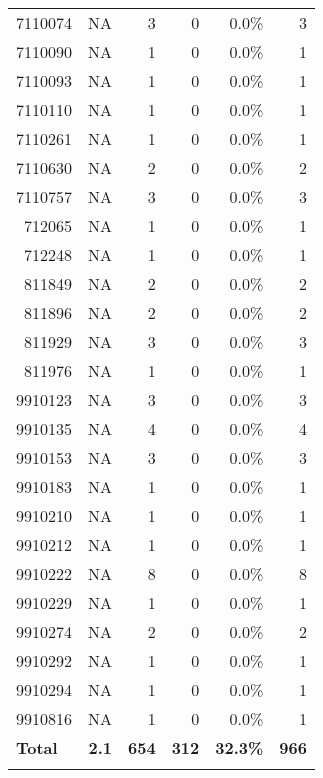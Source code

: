 \begin{longtable}{lrrrrr}
	    \multicolumn{1}{r}{7110074} & NA    & 3     & 0     & 0.0\% & 3 \\
	    \multicolumn{1}{r}{7110090} & NA    & 1     & 0     & 0.0\% & 1 \\
	    \multicolumn{1}{r}{7110093} & NA    & 1     & 0     & 0.0\% & 1 \\
	    \multicolumn{1}{r}{7110110} & NA    & 1     & 0     & 0.0\% & 1 \\
	    \multicolumn{1}{r}{7110261} & NA    & 1     & 0     & 0.0\% & 1 \\
	    \multicolumn{1}{r}{7110630} & NA    & 2     & 0     & 0.0\% & 2 \\
	    \multicolumn{1}{r}{7110757} & NA    & 3     & 0     & 0.0\% & 3 \\
	    \multicolumn{1}{r}{712065} & NA    & 1     & 0     & 0.0\% & 1 \\
	    \multicolumn{1}{r}{712248} & NA    & 1     & 0     & 0.0\% & 1 \\
	    \multicolumn{1}{r}{811849} & NA    & 2     & 0     & 0.0\% & 2 \\
	    \multicolumn{1}{r}{811896} & NA    & 2     & 0     & 0.0\% & 2 \\
	    \multicolumn{1}{r}{811929} & NA    & 3     & 0     & 0.0\% & 3 \\
	    \multicolumn{1}{r}{811976} & NA    & 1     & 0     & 0.0\% & 1 \\
	    \multicolumn{1}{r}{9910123} & NA    & 3     & 0     & 0.0\% & 3 \\
	    \multicolumn{1}{r}{9910135} & NA    & 4     & 0     & 0.0\% & 4 \\
	    \multicolumn{1}{r}{9910153} & NA    & 3     & 0     & 0.0\% & 3 \\
	    \multicolumn{1}{r}{9910183} & NA    & 1     & 0     & 0.0\% & 1 \\
	    \multicolumn{1}{r}{9910210} & NA    & 1     & 0     & 0.0\% & 1 \\
	    \multicolumn{1}{r}{9910212} & NA    & 1     & 0     & 0.0\% & 1 \\
	    \multicolumn{1}{r}{9910222} & NA    & 8     & 0     & 0.0\% & 8 \\
	    \multicolumn{1}{r}{9910229} & NA    & 1     & 0     & 0.0\% & 1 \\
	    \multicolumn{1}{r}{9910274} & NA    & 2     & 0     & 0.0\% & 2 \\
	    \multicolumn{1}{r}{9910292} & NA    & 1     & 0     & 0.0\% & 1 \\
	    \multicolumn{1}{r}{9910294} & NA    & 1     & 0     & 0.0\% & 1 \\
	    \multicolumn{1}{r}{9910816} & NA    & 1     & 0     & 0.0\% & 1 \\
	    \textbf{Total} & \textbf{2.1} & \textbf{654} & \textbf{312} & \textbf{32.3\%} & \textbf{966} \\
	    \label{tab:pmno}
\end{longtable}
